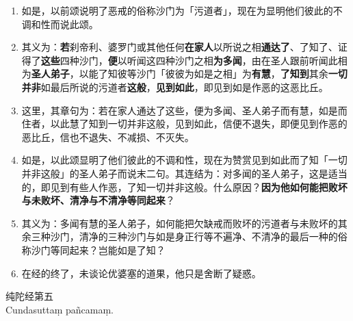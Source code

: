 \begin{enumerate}\item 如是，以前颂说明了恶戒的俗称沙门为「污道者」，现在为显明他们彼此的不调和性而说此颂。
\item 其义为：\textbf{若}刹帝利、婆罗门或其他任何\textbf{在家人}以所说之相\textbf{通达了}、了知了、证得了\textbf{这些}四种沙门，\textbf{便}以听闻这四种沙门之相\textbf{为多闻}，由在圣人跟前听闻此相为\textbf{圣人弟子}，以能了知彼等沙门「彼彼为如是之相」为\textbf{有慧}，\textbf{了知到}其余\textbf{一切并非}如最后所说的污道者\textbf{这般}，\textbf{见到如此}，即见到如是作恶的这恶比丘。
\item 这里，其章句为：若在家人通达了这些，便为多闻、圣人弟子而有慧，如是而住者，以此慧了知到一切并非这般，见到如此，信便不退失，即便见到作恶的恶比丘，信也不退失、不减损、不灭失。
\item 如是，以此颂显明了他们彼此的不调和性，现在为赞赏见到如此而了知「一切并非这般」的圣人弟子而说末二句。其连结为：对多闻的圣人弟子，这是适当的，即见到有些人作恶，了知一切并非这般。什么原因？\textbf{因为他如何能把败坏与未败坏、清净与不清净等同起来}？
\item 其义为：多闻有慧的圣人弟子，如何能把欠缺戒而败坏的污道者与未败坏的其余三种沙门，清净的三种沙门与如是身正行等不遍净、不清净的最后一种的俗称沙门等同起来？岂能如是了知？
\item 在经的终了，未谈论优婆塞的道果，他只是舍断了疑惑。\end{enumerate}

\begin{center}\vspace{1em}纯陀经第五\\Cundasuttaṃ pañcamaṃ.\end{center}

